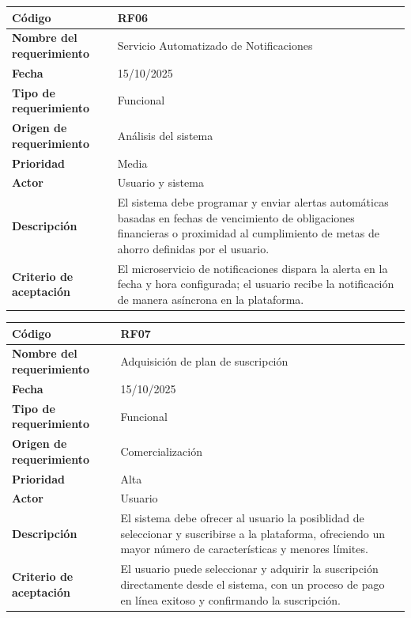 \begin{table}[H]
	\begin{tabular}{|a{5cm}|m{11cm}|}
		\hline
		\textbf{Código} & RF06 \\ \hline
		\textbf{Nombre del requerimiento} & Servicio Automatizado de Notificaciones \\ \hline
		\textbf{Fecha} & 15/10/2025 \\ \hline
		\textbf{Tipo de requerimiento} & Funcional \\ \hline
		\textbf{Origen de requerimiento} & Análisis del sistema \\ \hline
		\textbf{Prioridad} & Media \\ \hline
		\textbf{Actor} & Usuario y sistema \\ \hline
		\textbf{Descripción} & El sistema debe programar y enviar alertas automáticas basadas en fechas de vencimiento de obligaciones financieras o proximidad al cumplimiento de metas de ahorro definidas por el usuario. \\ \hline
		\textbf{Criterio de aceptación} & El microservicio de notificaciones dispara la alerta en la fecha y hora configurada; el usuario recibe la notificación de manera asíncrona en la plataforma. \\ \hline
	\end{tabular}
\end{table}

\begin{table}[H]
	\begin{tabular}{|a{5cm}|m{11cm}|}
		\hline
		\textbf{Código} & RF07 \\ \hline
		\textbf{Nombre del requerimiento} & Adquisición de plan de suscripción \\ \hline
		\textbf{Fecha} & 15/10/2025 \\ \hline
		\textbf{Tipo de requerimiento} & Funcional \\ \hline
		\textbf{Origen de requerimiento} & Comercialización \\ \hline
		\textbf{Prioridad} & Alta \\ \hline
		\textbf{Actor} & Usuario \\ \hline
		\textbf{Descripción} & El sistema debe ofrecer al usuario la posiblidad de seleccionar y suscribirse a la plataforma, ofreciendo un mayor número de características y menores límites. \\ \hline
		\textbf{Criterio de aceptación} & El usuario puede seleccionar y adquirir la suscripción directamente desde el sistema, con un proceso de pago en línea exitoso y confirmando la suscripción. \\ \hline
	\end{tabular}
\end{table}

